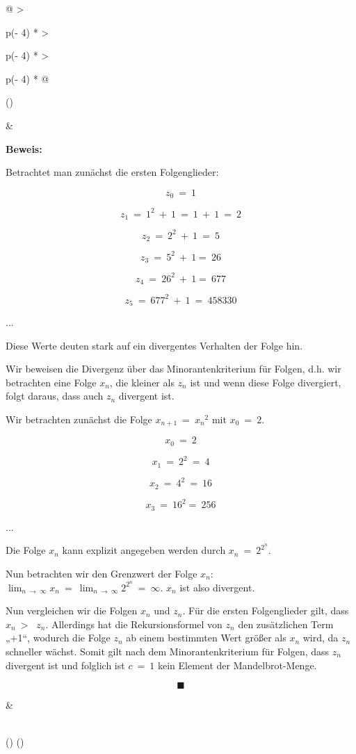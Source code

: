 \documentclass[a4paper, 12pt]{book}
\begin{document}
\begin{longtable}[]{@{}
  >{\raggedright\arraybackslash}p{(\columnwidth - 4\tabcolsep) * }
  >{\raggedright\arraybackslash}p{(\columnwidth - 4\tabcolsep) * }
  >{\raggedright\arraybackslash}p{(\columnwidth - 4\tabcolsep) * }@{}}
\toprule()
\begin{minipage}[b]{\linewidth}\raggedright
\end{minipage} & \begin{minipage}[b]{\linewidth}\raggedright
\textbf{Beweis:}

Betrachtet man zunächst die ersten Folgenglieder:

\[z_{0}\  = \ 1\]

\[z_{1}\  = \ 1^{2}\  + \ 1\  = \ 1\  + \ 1\  = \ 2\]

\[z_{2}\  = \ 2^{2}\  + \ 1\  = \ 5\]

\[z_{3}\  = \ 5^{2}\  + \ 1 = \ 26\]

\[z_{4}\  = \ 26^{2}\  + \ 1 = \ 677\]

\[z_{5}\  = \ 677^{2}\  + \ 1\  = \ 458330\]

...

Diese Werte deuten stark auf ein divergentes Verhalten der Folge hin.

Wir beweisen die Divergenz über das Minorantenkriterium für Folgen, d.h.
wir betrachten eine Folge \(x_{n}\), die kleiner als \(z_{n}\) ist und
wenn diese Folge divergiert, folgt daraus, dass auch \(z_{n}\) divergent
ist.

Wir betrachten zunächst die Folge \(x_{n + 1}\  = \ {x_{n}}^{2}\) mit
\(x_{0}\  = \ 2\).

\[x_{0}\  = \ 2\]

\[x_{1}\  = \ 2^{2}\  = \ 4\]

\[x_{2}\  = \ 4^{2}\  = \ 16\]

\[x_{3}\  = \ 16^{2} = \ 256\]

...

Die Folge \(x_{n}\) kann explizit angegeben werden durch
\(x_{n}\  = \ 2^{2^{n}}\).

Nun betrachten wir den Grenzwert der Folge \(x_{n}\):
\(\lim_{n\  \rightarrow \ \infty}x_{n}\  = \ \lim_{n\  \rightarrow \ \infty}2^{2^{n}}\  = \ \infty\).
\(x_{n}\) ist also divergent.

Nun vergleichen wir die Folgen \(x_{n}\) und \(z_{n}\). Für die ersten
Folgenglieder gilt, dass \(x_{n}\  > \ \) \(z_{n}\). Allerdings hat die
Rekursionsformel von \(z_{n}\) den zusätzlichen Term „+1``, wodurch die
Folge \(z_{n}\) ab einem bestimmten Wert größer als \(x_{n}\) wird, da
\(z_{n}\) schneller wächst. Somit gilt nach dem Minorantenkriterium für
Folgen, dass \(z_{n}\) divergent ist und folglich ist \(c\  = \ 1\) kein
Element der Mandelbrot-Menge.

\[\blacksquare\]
\end{minipage} & \begin{minipage}[b]{\linewidth}\raggedright
\end{minipage} \\
\midrule()
\endhead
\bottomrule()
\end{longtable}
\end{document}
